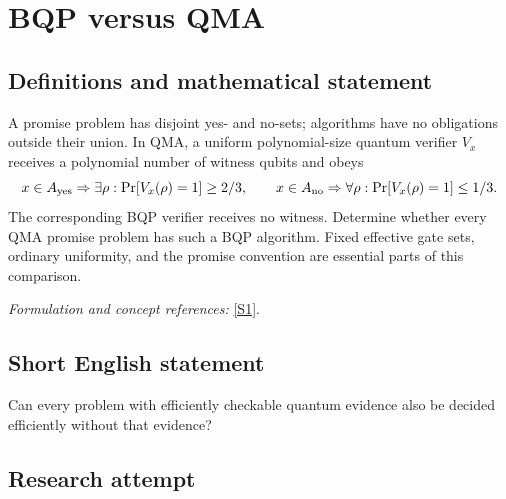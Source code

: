\documentclass[11pt,a4paper]{article}
\newcommand{\sref}[2]{\hyperlink{source:#1:#2}{[S#2]}}
\newif\ifshowcatalogue
\newcommand{\cataloguescope}[1]{\ifshowcatalogue
 \paragraph{Exact scope in the supplied catalogue.}
 \begin{quote}\small #1\end{quote}\fi}
\numberwithin{equation}{section}
\begin{document}
\setcounter{section}{47}
\clearpage
\section{\texorpdfstring{BQP versus QMA}{BQP versus QMA}}\label{48}
\subsection{Definitions and mathematical statement}
A promise problem has disjoint yes- and no-sets; algorithms have no obligations outside their union. In QMA, a uniform polynomial-size quantum verifier $V_x$ receives a polynomial number of witness qubits and obeys
\[
 x\in A_{\rm yes}\Rightarrow\exists\rho:\Pr[V_x(\rho)=1]\ge2/3,\qquad
 x\in A_{\rm no}\Rightarrow\forall\rho:\Pr[V_x(\rho)=1]\le1/3.
\]
The corresponding BQP verifier receives no witness. Determine whether every QMA promise problem has such a BQP algorithm. Fixed effective gate sets, ordinary uniformity, and the promise convention are essential parts of this comparison.
\par\smallskip\textit{Formulation and concept references:} \sref{48}{1}.
\cataloguescope{For promise problems A=(A\_yes,A\_no) with disjoint sets of finite binary strings, use polynomial-time uniform quantum circuits over a fixed effectively specified finite universal gate set, with polynomially many gates and |0> ancillas and a measured output bit. BQP has such a circuit accepting each yes input with probability>=2/3 and each no input with probability<=1/3. QMA permits a polynomial-length quantum witness: each yes input has a witness accepted with probability>=2/3, and every witness on each no input is accepted with probability<=1/3. Outside the promise no condition is imposed. Is QMA contained in BQP, equivalently BQP=QMA?}
\subsection{Short English statement}
Can every problem with efficiently checkable quantum evidence also be decided efficiently without that evidence?
\subsection{Research attempt}
\end{document}
